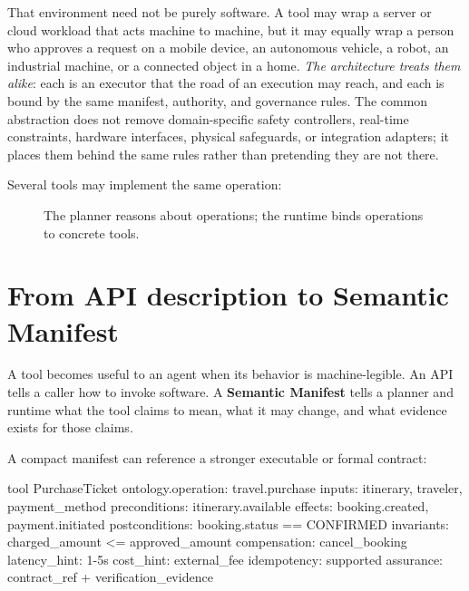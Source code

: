 \documentclass[10pt,oneside,openany]{book}
\newcommand{\term}[1]{\textbf{#1}}
\begin{document}
That environment need not be purely software. A tool may wrap a server or cloud workload that acts machine to machine, but it may equally wrap a person who approves a request on a mobile device, an autonomous vehicle, a robot, an industrial machine, or a connected object in a home. \emph{The architecture treats them alike}: each is an executor that the road of an execution may reach, and each is bound by the same manifest, authority, and governance rules. The common abstraction does not remove domain-specific safety controllers, real-time constraints, hardware interfaces, physical safeguards, or integration adapters; it places them behind the same rules rather than pretending they are not there.

Several tools may implement the same operation:

\begin{figure}[ht]
\centering
{}
\caption{The planner reasons about operations; the runtime binds operations to concrete tools.}
\end{figure}

\section{From API description to Semantic Manifest}
A tool becomes useful to an agent when its behavior is machine-legible. An API tells a caller how to invoke software. A \term{Semantic Manifest} tells a planner and runtime what the tool claims to mean, what it may change, and what evidence exists for those claims.

A compact manifest can reference a stronger executable or formal contract:

\begin{codeblock}
tool PurchaseTicket {
  ontology.operation: travel.purchase
  inputs: itinerary, traveler, payment_method
  preconditions: itinerary.available
  effects: booking.created, payment.initiated
  postconditions: booking.status == CONFIRMED
  invariants: charged_amount <= approved_amount
  compensation: cancel_booking
  latency_hint: 1-5s
  cost_hint: external_fee
  idempotency: supported
  assurance: contract_ref + verification_evidence
}
\end{codeblock}
\end{document}
